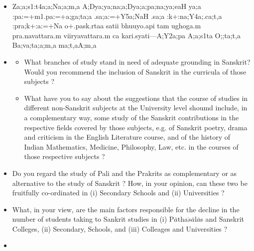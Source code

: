 \begin{spacing}{1.15}
\begin{itemize}
\begin{itemize}
    \item[({\sktf ga})] {\sktf Za;a;s1:t4a;a;Na;a;m,a
A;Dya;ya;na;a;Dya;a;pa;na;ya;eaH ya;a :pa:=+m1.pa:=+a;ga;ta;a
.sa;a:=+Y5a;NaH\ZF{,} .sa;a :k+:na;Y4a;.ca;t,a
:pra;k+:a:=+Na o+.pa}{\sktf sk.rtaa satii bhuuyo.api tam ughoga.m pra.navattara.m viiryavattara.m ca
kari.syati}{\rm ---}{\sktf A;Y2a;pa A;a;s1ta O;;ta;t,a
Ba;va;ta;a;m,a ma;t,aA;m,a }
 \end{itemize}
 \end{itemize}
\end{spacing}

{\rm 
\begin{itemize}
\item[14] \begin{itemize}
                 \item[(a)] What branches of study stand in need of adequate grounding in Sanskrit? Would you recommend the inclusion of Sanskrit in the curricula of those subjects ?
                 
                 \item[(b)] What have you to say about the suggestions that the course of studies in different non-Sanskrit subjects at the University level shoumd include, in a complementary way, some study of the Sanskrit contributions in the respective fields covered by those subjects, e.g. of Sanskrit poetry, drama and criticism in the English Literature course, and of the history of Indian Mathematics, Medicine, Philosophy, Law, etc. in the courses of those respective subjects ?
              \end{itemize}        
              
    \item[15] Do you regard the study of Pali and the Prakrits as complementary or as alternative to the study of Sanskrit ? How, in your opinion, can these two be fruitfully co-ordinated in (i) Secondary Schools and (ii) Universities ?          
     
     \item[16] What, in your view, are the main factors responsible for the decline in the number of students taking to Sankrit studies in (i) P$\bar{a}$tha$\acute{s}\bar{a}$l$\bar{a}$s and Sanskrit Colleges, (ii) Secondary, Schools, and (iii) Colleages and Universities ?         
      
      \item[17] \begin{itemize}
                 

\end{itemize}
\end{itemize}}
